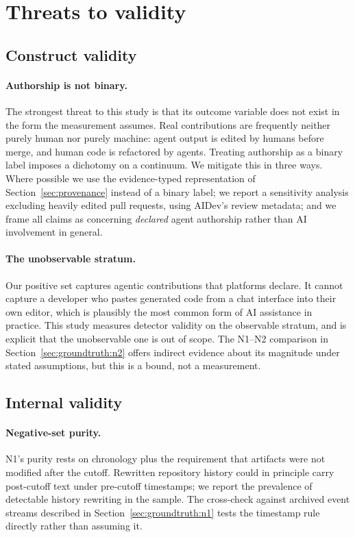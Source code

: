 \section{Threats to validity}
\label{sec:threats}

\subsection{Construct validity}
\label{sec:threats:construct}

\paragraph{Authorship is not binary.} The strongest threat to this study is that its
outcome variable does not exist in the form the measurement assumes. Real contributions
are frequently neither purely human nor purely machine: agent output is edited by
humans before merge, and human code is refactored by agents. Treating authorship as a
binary label imposes a dichotomy on a continuum. We mitigate this in three ways. Where
possible we use the evidence-typed representation of Section~\ref{sec:provenance}
instead of a binary label; we report a sensitivity analysis excluding heavily edited
pull requests, using AIDev's review metadata; and we frame all claims as concerning
\emph{declared} agent authorship rather than AI involvement in general.

\paragraph{The unobservable stratum.} Our positive set captures agentic contributions
that platforms declare. It cannot capture a developer who pastes generated code from a
chat interface into their own editor, which is plausibly the most common form of AI
assistance in practice. This study measures detector validity on the observable
stratum, and is explicit that the unobservable one is out of scope. The N1--N2
comparison in Section~\ref{sec:groundtruth:n2} offers indirect evidence about its
magnitude under stated assumptions, but this is a bound, not a measurement.

\subsection{Internal validity}
\label{sec:threats:internal}

\paragraph{Negative-set purity.} N1's purity rests on chronology plus the requirement
that artifacts were not modified after the cutoff. Rewritten repository history could in
principle carry post-cutoff text under pre-cutoff timestamps; we report the prevalence
of detectable history rewriting in the sample. The cross-check against archived event
streams described in Section~\ref{sec:groundtruth:n1} tests the timestamp rule directly
rather than assuming it.

